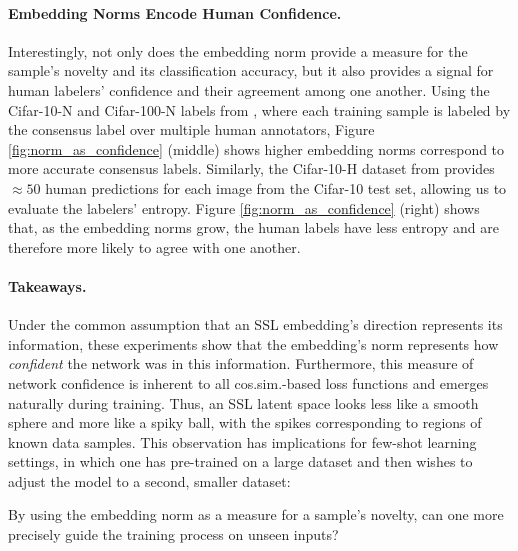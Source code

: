 \paragraph{Embedding Norms Encode Human Confidence.} Interestingly, not only does the embedding norm provide a measure for the sample's novelty and its classification accuracy, but it also provides a signal for human labelers' confidence and their agreement among one another. Using the Cifar-10-N and Cifar-100-N labels from \citet{cifarN}, where each training sample is labeled by the consensus label over multiple human annotators, Figure \ref{fig:norm_as_confidence} (middle) shows higher embedding norms correspond to more accurate consensus labels. Similarly, the Cifar-10-H dataset from \citet{cifarH} provides $\approx 50$ human predictions for each image from the Cifar-10 test set, allowing us to evaluate the labelers' entropy. Figure \ref{fig:norm_as_confidence} (right) shows that, as the embedding norms grow, the human labels have less entropy and are therefore more likely to agree with one another.

\paragraph{Takeaways.} Under the common assumption that an SSL embedding's direction represents its information, these experiments show that the embedding's norm represents how \emph{confident} the network was in this information. Furthermore, this measure of network confidence is inherent to all cos.sim.-based loss functions and emerges naturally during training. Thus, an SSL latent space looks less like a smooth sphere and more like a spiky ball, with the spikes corresponding to regions of known data samples. This observation has implications for few-shot learning settings, in which one has pre-trained on a large dataset and then wishes to adjust the model to a second, smaller dataset:

\begin{question}
    By using the embedding norm as a measure for a sample's novelty, can one more precisely guide the training process on unseen inputs?
\end{question} 